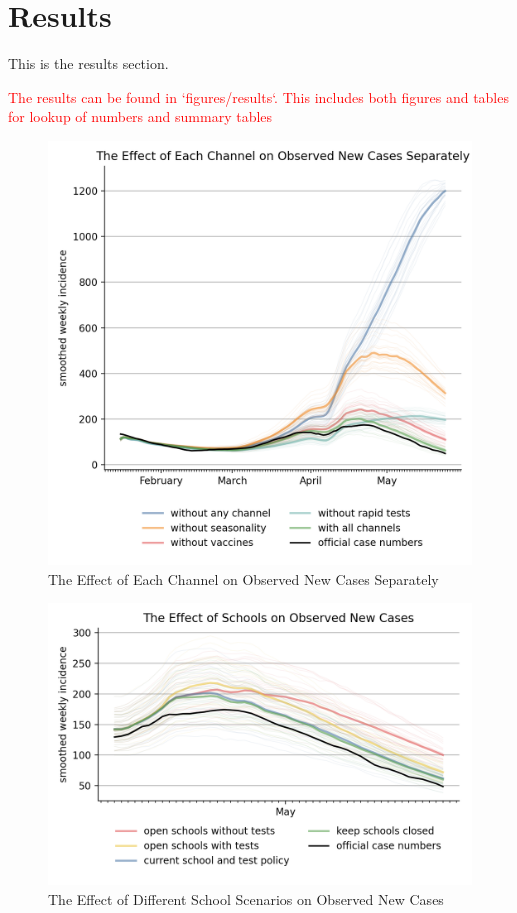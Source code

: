 \section{Results}
\label{sec:results}

This is the results section.

\textcolor{red}{The results can be found in `figures/results`. This includes both figures
and tables for lookup of numbers and summary tables}


\begin{figure}[ht]
    \centering
    \includegraphics[width=0.9 \textwidth]{../figures/results/figures/comparisons/one_off_and_combined/full_new_known_case}
    \caption{The Effect of Each Channel on Observed New Cases Separately}
    \label{fig:explain_decline}
    \figurenotes{\textcolor{red}{\ldots}}
\end{figure}

\begin{figure}[ht]
    \centering
    \includegraphics[width=0.9 \textwidth]{../figures/results/figures/comparisons/school_scenarios/full_new_known_case}
    \caption{The Effect of Different School Scenarios on Observed New Cases}
    \label{fig:school_scenarios}
    \figurenotes{\textcolor{red}{\ldots}}
\end{figure}


\FloatBarrier

